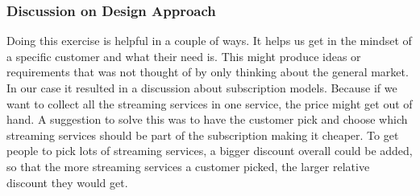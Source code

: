 \subsubsection{Discussion on Design Approach}
Doing this exercise is helpful in a couple of ways. It helps us get in the mindset of a specific customer and what their need is. This might produce ideas or requirements that was not thought of by only thinking about the general market. In our case it resulted in a discussion about subscription models. Because if we want to collect all the streaming services in one service, the price might get out of hand. A suggestion to solve this was to have the customer pick and choose which streaming services should be part of the subscription making it cheaper. To get people to pick lots of streaming services, a bigger discount overall could be added, so that the more streaming services a customer picked, the larger relative discount they would get.

